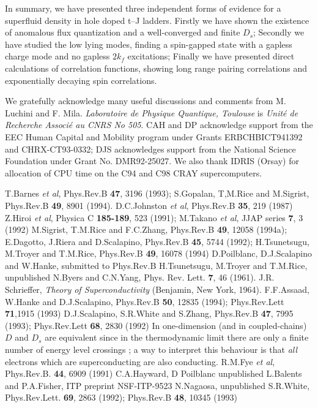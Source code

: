{\bigskip
In summary, we have presented three independent forms of evidence
for a superfluid density
in hole doped t--J ladders.
Firstly we have shown the existence of anomalous flux quantization and a
well-converged and finite
$D_s$; Secondly we have studied the low lying modes, finding a spin-gapped
state with
a gapless charge mode and no gapless $2k_f$ excitations; Finally we have
presented direct calculations of correlation functions, showing long range
pairing correlations and exponentially decaying spin correlations.

\bigskip
We gratefully acknowledge many useful discussions and comments from
M. Luchini and F. Mila.
{\it Laboratoire de Physique Quantique, Toulouse} is
{\it Unit\'e de Recherche Associ\'e au CNRS No 505}.
CAH and
DP  acknowledge support from the EEC Human Capital and Mobility
program under Grants ERBCHBICT941392 and  CHRX-CT93-0332; DJS  acknowledges
support from the National Science Foundation
under Grant No. DMR92-25027.
We also thank IDRIS (Orsay)
for allocation of CPU time on the C94 and C98 CRAY supercomputers.

\begin{references}

 T.Barnes {\it et al}, Phys.Rev.B {\bf 47}, 3196 (1993);
     S.Gopalan, T,M.Rice and M.Sigrist, Phys.Rev.B {\bf 49}, 8901 (1994).
 D.C.Johnston {\it et al}, Phys.Rev.B {\bf 35}, 219 (1987)
 Z.Hiroi {\it et al}, Physica C {\bf 185-189}, 523 (1991);
M.Takano {\it et al}, JJAP series {\bf 7}, 3 (1992)
 M.Sigrist, T.M.Rice and F.C.Zhang, Phys.Rev.B {\bf 49},
12058 (1994a);
	    E.Dagotto, J.Riera and D.Scalapino, Phys.Rev.B {\bf 45}, 5744 (1992);
	    H.Tsunetsugu, M.Troyer and T.M.Rice, Phys.Rev.B {\bf 49}, 16078 (1994)
 D.Poilblanc, D.J.Scalapino and W.Hanke, submitted to Phys.Rev.B
 H.Tsunetsugu, M.Troyer and T.M.Rice, unpublished
 N.Byers and C.N.Yang, Phys. Rev. Lett. {\bf 7}, 46 (1961).
 J.R. Schrieffer, {\it Theory of Superconductivity}
(Benjamin,
New York, 1964).
 F.F.Assaad, W.Hanke and D.J.Scalapino, Phys.Rev.B {\bf 50},
12835 (1994);
 Phys.Rev.Lett {\bf 71},1915 (1993)
 D.J.Scalapino, S.R.White and S.Zhang, Phys.Rev.B {\bf 47}, 7995
(1993);
 Phys.Rev.Lett {\bf 68}, 2830 (1992)
 In  one-dimension
 (and in  coupled-chains)
 $D$ and $D_s$ are equivalent  since in the thermodynamic limit there are
only a finite number of energy level crossings \cite{swz};
a way to interpret this behaviour
is that {\it all} electrons which are superconducting are also conducting.
 R.M.Fye {\it et al}, Phys.Rev.B. {\bf 44}, 6909 (1991)
 C.A.Hayward, D Poilblanc unpublished
 L.Balents and P.A.Fisher, ITP preprint NSF-ITP-9523
 N.Nagaosa, unpublished
 S.R.White, Phys.Rev.Lett. {\bf 69}, 2863 (1992); Phys.Rev.B {\bf
48},
10345 (1993)
\end{references}

}
